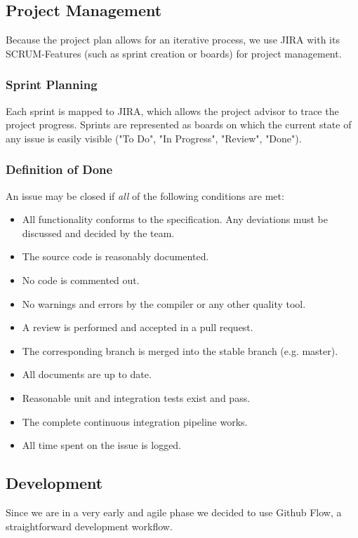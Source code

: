 \documentclass[a4paper]{article}
\begin{document}
\subsection{Project Management}
Because the project plan allows for an iterative process, we use JIRA with its SCRUM-Features (such as sprint creation or boards) for project management.

\subsubsection{Sprint Planning}
Each sprint is mapped to JIRA, which allows the project advisor to trace the project progress. Sprints are represented as boards on which the current state of any issue is easily visible ("To Do", "In Progress", "Review", "Done").


\subsubsection{Definition of Done}
An issue may be closed if \emph{all} of the following conditions are met:

\begin{itemize}
	\item All functionality conforms to the specification. Any deviations must be discussed and decided by the team.
	\item The source code is reasonably documented.
	\item No code is commented out.
	\item No warnings and errors by the compiler or any other quality tool.
	\item A review is performed and accepted in a pull request.
	\item The corresponding branch is merged into the stable branch (e.g. master).
	\item All documents are up to date.
	\item Reasonable unit and integration tests exist and pass.
	\item The complete continuous integration pipeline works.
	\item All time spent on the issue is logged.
\end{itemize}

\subsection{Development}

Since we are in a very early and agile phase we decided to use Github Flow\cite{github-flow}, a straightforward development workflow.
\end{document}
